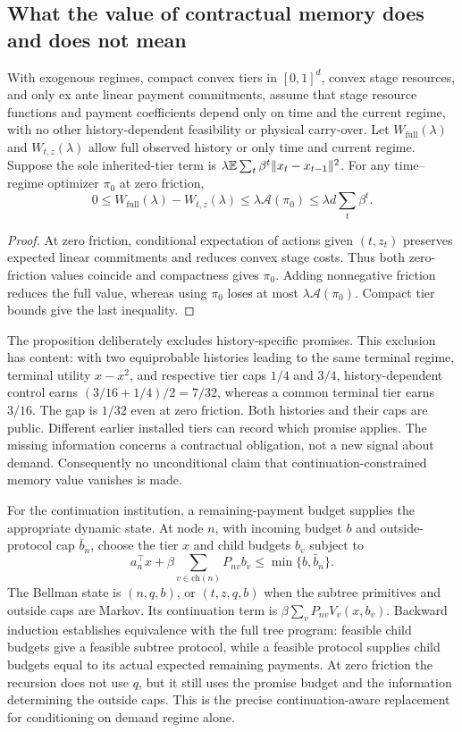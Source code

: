 \subsection{What the value of contractual memory does and does not mean}
\begin{proposition}\label{prop:r10-memory}
With exogenous regimes, compact convex tiers in $[0,1]^d$, convex stage resources, and only ex ante linear payment commitments, assume that stage resource functions and payment coefficients depend only on time and the current regime, with no other history-dependent feasibility or physical carry-over. Let $W_{\mathrm{full}}(\lambda)$ and $W_{t,z}(\lambda)$ allow full observed history or only time and current regime. Suppose the sole inherited-tier term is $\lambda\mathbb E\sum_t\beta^t\|x_t-x_{t-1}\|^2$. For any time--regime optimizer $\pi_0$ at zero friction,
\[
 0\leq W_{\mathrm{full}}(\lambda)-W_{t,z}(\lambda)
 \leq\lambda\mathcal A(\pi_0)\leq\lambda d\sum_t\beta^t.
\]
\end{proposition}
\begin{proof}
At zero friction, conditional expectation of actions given $(t,z_t)$ preserves expected linear commitments and reduces convex stage costs. Thus both zero-friction values coincide and compactness gives $\pi_0$. Adding nonnegative friction reduces the full value, whereas using $\pi_0$ loses at most $\lambda\mathcal A(\pi_0)$. Compact tier bounds give the last inequality.
\end{proof}
The proposition deliberately excludes history-specific promises. This exclusion has content: with two equiprobable histories leading to the same terminal regime, terminal utility $x-x^2$, and respective tier caps $1/4$ and $3/4$, history-dependent control earns $(3/16+1/4)/2=7/32$, whereas a common terminal tier earns $3/16$. The gap is $1/32$ even at zero friction. Both histories and their caps are public. Different earlier installed tiers can record which promise applies. The missing information concerns a contractual obligation, not a new signal about demand. Consequently no unconditional claim that continuation-constrained memory value vanishes is made.

For the continuation institution, a remaining-payment budget supplies the appropriate dynamic state. At node $n$, with incoming budget $b$ and outside-protocol cap $\bar b_n$, choose the tier $x$ and child budgets $b_v$ subject to
\begin{equation}\label{eq:r10-budget-dp}
 a_n^\top x+\beta\sum_{v\in\mathrm{ch}(n)}P_{nv}b_v\leq\min\{b,\bar b_n\}.
\end{equation}
The Bellman state is $(n,q,b)$, or $(t,z,q,b)$ when the subtree primitives and outside caps are Markov. Its continuation term is $\beta\sum_vP_{nv}V_v(x,b_v)$. Backward induction establishes equivalence with the full tree program: feasible child budgets give a feasible subtree protocol, while a feasible protocol supplies child budgets equal to its actual expected remaining payments. At zero friction the recursion does not use $q$, but it still uses the promise budget and the information determining the outside caps. This is the precise continuation-aware replacement for conditioning on demand regime alone.
